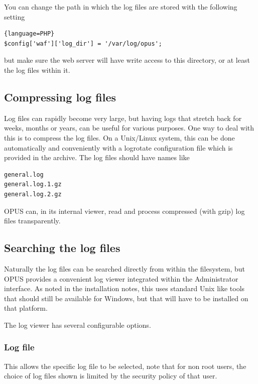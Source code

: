 \documentclass[12 pt]{book}
\begin{document}
You can change the path in which the log files are stored with the following setting

\begin{lstlisting}{language=PHP}
$config['waf']['log_dir'] = '/var/log/opus';
\end{lstlisting}

but make sure the web server will have write access to this directory, or at least the log files within it.


\subsection{Compressing log files}

Log files can rapidly become very large, but having logs that stretch back for weeks, months or years, can
be useful for various purposes. One way to deal with this is to compress the log files. On a Unix/Linux
system, this can be done automatically and conveniently with a logrotate configuration file which is
provided in the archive. The log files should have names like

\begin{lstlisting}
general.log
general.log.1.gz
general.log.2.gz
\end{lstlisting}

OPUS can, in its internal viewer, read and process compressed (with gzip) log files transparently.


\subsection{Searching the log files}

Naturally the log files can be searched directly from within the filesystem, but OPUS provides a
convenient log viewer integrated within the Administrator interface. As noted in the installation notes,
this uses standard Unix like tools that should still be available for Windows, but that will have to
be installed on that platform.

The log viewer has several configurable options.

\subsubsection{Log file}

This allows the specific log file to be selected, note that for non root users, the choice of log files
shown is limited by the security policy of that user.
\end{document}
